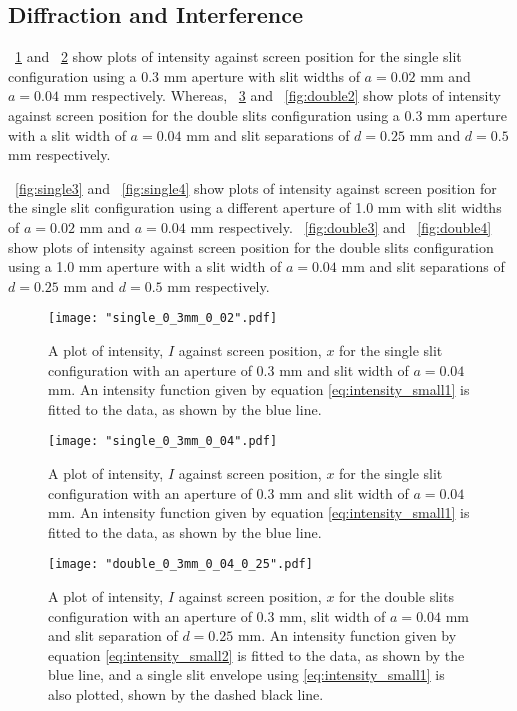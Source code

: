 \documentclass{article}
\newcommand{\figref}[2][\figurename~]{#1\ref{#2}}
\begin{document}
\subsection{Diffraction and Interference}
\label{ssec:diffraction-method}

\figref{fig:single1} and \figref{fig:single2} show plots of intensity against screen position for the single slit configuration using a 0.3 mm aperture with slit widths of $a = 0.02$ mm and $a = 0.04$ mm respectively. Whereas, \figref{fig:double1} and \figref{fig:double2} show plots of intensity against screen position for the double slits configuration using a 0.3 mm aperture with a slit width of $a = 0.04$ mm and slit separations of $d = 0.25$ mm and $d = 0.5$ mm respectively.

\vspace{2mm}
\noindent
\figref{fig:single3} and \figref{fig:single4} show plots of intensity against screen position for the single slit configuration using a different aperture of 1.0 mm with slit widths of $a = 0.02$ mm and $a = 0.04$ mm respectively. \figref{fig:double3} and \figref{fig:double4} show plots of intensity against screen position for the double slits configuration using a 1.0 mm aperture with a slit width of $a = 0.04$ mm and slit separations of $d = 0.25$ mm and $d = 0.5$ mm respectively.

\begin{figure}[h]
\centering
\texttt{[image: "single\_0\_3mm\_0\_02".pdf]}
\caption{A plot of intensity, $I$ against screen position, $x$ for the single slit configuration with an aperture of 0.3 mm and slit width of $ a = 0.04$ mm. An intensity function given by equation \eqref{eq:intensity_small1} is fitted to the data, as shown by the blue line.}
\label{fig:single1}
\end{figure}

\begin{figure}[h]
\centering
\texttt{[image: "single\_0\_3mm\_0\_04".pdf]}
\caption{A plot of intensity, $I$ against screen position, $x$ for the single slit configuration with an aperture of 0.3 mm and slit width of $a = 0.04$ mm. An intensity function given by equation \eqref{eq:intensity_small1} is fitted to the data, as shown by the blue line.}
\label{fig:single2}
\end{figure}

\begin{figure}[h]
\centering
\texttt{[image: "double\_0\_3mm\_0\_04\_0\_25".pdf]}
\caption{A plot of intensity, $I$ against screen position, $x$ for the double slits configuration with an aperture of 0.3 mm, slit width of $a = 0.04$ mm and slit separation of $d = 0.25$ mm. An intensity function given by equation \eqref{eq:intensity_small2} is fitted to the data, as shown by the blue line, and a single slit envelope using \eqref{eq:intensity_small1} is also plotted, shown by the dashed black line.}
\label{fig:double1}
\end{figure}
\end{document}
